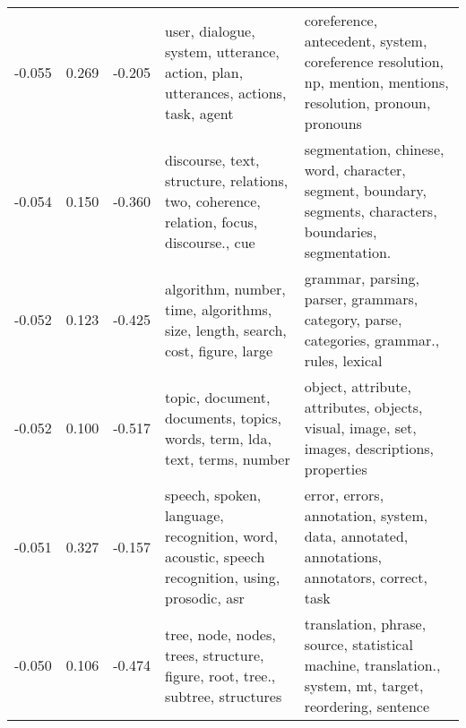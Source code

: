 \begin{tabular}{cccp{5cm}p{5cm}}
-0.055 & 0.269 & -0.205 & user, dialogue, system, utterance, action, plan, utterances, actions, task, agent & coreference, antecedent, system, coreference resolution, np, mention, mentions, resolution, pronoun, pronouns \\
-0.054 & 0.150 & -0.360 & discourse, text, structure, relations, two, coherence, relation, focus, discourse., cue & segmentation, chinese, word, character, segment, boundary, segments, characters, boundaries, segmentation. \\
-0.052 & 0.123 & -0.425 & algorithm, number, time, algorithms, size, length, search, cost, figure, large & grammar, parsing, parser, grammars, category, parse, categories, grammar., rules, lexical \\
-0.052 & 0.100 & -0.517 & topic, document, documents, topics, words, term, lda, text, terms, number & object, attribute, attributes, objects, visual, image, set, images, descriptions, properties \\
-0.051 & 0.327 & -0.157 & speech, spoken, language, recognition, word, acoustic, speech recognition, using, prosodic, asr & error, errors, annotation, system, data, annotated, annotations, annotators, correct, task \\
-0.050 & 0.106 & -0.474 & tree, node, nodes, trees, structure, figure, root, tree., subtree, structures & translation, phrase, source, statistical machine, translation., system, mt, target, reordering, sentence \\
\bottomrule
\end{tabular}
